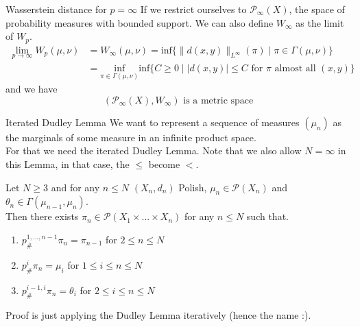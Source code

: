 \documentclass[10pt]{beamer}
\begin{document}
\begin{frame}{Wasserstein distance for $p = \infty$}
    If we restrict ourselves to $\mathcal{P}_\infty(X)$, the space of probability measures with bounded support. We can also define $W_\infty$ as the limit of $W_p$.
    \begin{align*}\lim_{p \to \infty} W_p(\mu,\nu) &= W_\infty(\mu,\nu) =\text{inf}\{\|d(x,y)\|_{L^\infty}(\pi) \mid \pi \in \Gamma(\mu,\nu)\} \\
    &= \underset{\pi \in \Gamma(\mu,\nu)}{\text{inf}}\text{inf}\{C \geq 0 \mid |d(x,y)| \leq C \text{ for } \pi \text{ almost all } (x,y)\} \end{align*} 
    and we have $$(\mathcal{P}_\infty(X), W_\infty) \text{ is a metric space}$$ 
\end{frame}




\begin{frame}{Iterated Dudley Lemma}
    We want to represent a sequence of measures $(\mu_n)$ as the marginals of some measure in an infinite product space. \\ 
    \vspace{0.5cm}
    For that we need the iterated Dudley Lemma. Note that we also allow $N = \infty$ in this Lemma, in that case, the $\leq$ become $<$.
    \begin{lemma}
        Let $N \geq 3$ and for any $n \leq N$ $(X_n,d_n)$ Polish, $\mu_n \in \mathcal{P}(X_n)$ and $\theta_n \in \Gamma(\mu_{n-1},\mu_n)$. \\ 
        Then there exists $\pi_n \in \mathcal{P}(X_1\times ... \times X_n)$ for any $n \leq N$ such that.
        \begin{enumerate}
            \item $p^{1,...,n-1}_{\#} \pi_n = \pi_{n-1}$ for $2 \leq n \leq N$
            \item $p^i_{\#} \pi_n = \mu_i$ for $1 \leq i \leq n \leq N$
            \item $p^{i-1,i}_{\#} \pi_n = \theta_i$ for $2 \leq i\leq n \leq N$
        \end{enumerate}
    \end{lemma}
    Proof is just applying the Dudley Lemma iteratively (hence the name :).
\end{frame}
\end{document}
